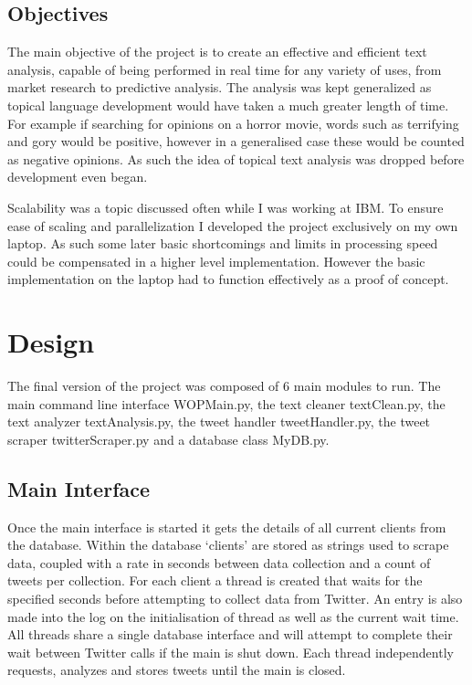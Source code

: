 \documentclass[12pt,a4paper]{report}
\begin{document}
  \section{Objectives}
    The main objective of the project is to create an effective and efficient text analysis, capable of being performed in real time for any variety of uses, from market research to predictive analysis. The analysis was kept generalized as topical language development would have taken a much greater length of time. For example if searching for opinions on a horror movie, words such as terrifying and gory would be positive, however in a generalised case these would be counted as negative opinions. As such the idea of topical text analysis was dropped before development even began. 
    \par
    Scalability was a topic discussed often while I was working at IBM. To ensure ease of scaling and parallelization I developed the project exclusively on my own laptop. As such some later basic shortcomings and limits in processing speed could be compensated in a higher level implementation. However the basic implementation on the laptop had to function effectively as a proof of concept.

\chapter{Design}
  The final version of the project was composed of 6 main modules to run. The main command line interface WOPMain.py\cite{SourceCode}, the text cleaner textClean.py\cite{SourceCode}, the text analyzer textAnalysis.py\cite{SourceCode}, the tweet handler tweetHandler.py\cite{SourceCode}, the tweet scraper twitterScraper.py\cite{SourceCode} and a database class MyDB.py\cite{SourceCode}.
  \section{Main Interface}
  Once the main interface is started it gets the details of all current clients from the database. Within the database ‘clients’ are stored as strings used to scrape data, coupled with a rate in seconds between data collection and a count of tweets per collection. For each client a thread is created that waits for the specified seconds before attempting to collect data from Twitter. An entry is also made into the log on the initialisation of thread as well as the current wait time. All threads share a single database interface and will attempt to complete their wait between Twitter calls if the main is shut down. Each thread independently requests, analyzes and stores tweets until the main is closed.
\end{document}

